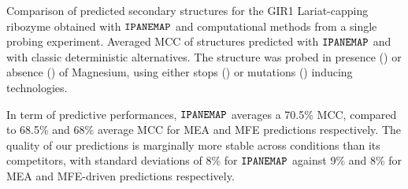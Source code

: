 \documentclass[a4,center,fleqn]{NAR}
\newcommand{\Software}[1]{$\text{\ttfamily #1}$}
\newcommand{\OurTool}{\Software{IPANEMAP}\xspace}
\newcommand{\didy }{{\sf GIR1 Lariat-capping ribozyme}\xspace}
\begin{document}
\begin{table}
	\caption{Comparison of predicted secondary structures for the \didy{} obtained with \OurTool{} and computational methods from a single probing experiment. Averaged MCC of structures predicted with \OurTool{} and with classic deterministic alternatives. The structure was probed in presence (\Mg) or absence (\NoMg) of Magnesium, using either stops (\Stop) or mutations (\Mut) inducing technologies.
	}
	\label{tab:thermo-ipan}
\end{table}


In term of predictive performances, \OurTool averages a 70.5\% MCC, compared to 68.5\% and 68\% average MCC for MEA and MFE predictions respectively. The quality of our predictions is marginally more stable across conditions than its competitors, with  standard deviations of 8\% for \OurTool against 9\% and 8\% for MEA and MFE-driven predictions respectively. 
\end{document}
